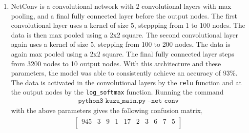 \documentclass[a4paper,11pt]{article}
\newcommand{\code}{\texttt}
\begin{document}
{{\begin{enumerate}[leftmargin=*]
			\begin{align*}
				\code{python3 kuzu\_main.py --net full} 
			\end{align*}
			with 170 hidden nodes gives the following confusion matrix,
			\begin{align*}
				\begin{bmatrix}
					856 & 5 & 8 & 3 & 44 & 8 & 3 & 16 & 11 & 4 \\
					3 & 820 & 10 & 12 & 27 & 11 & 11 & 11 & 27 & 17 \\
					2 & 30 & 826 & 33 & 20 & 69 & 40 & 17 & 24 & 46 \\
					6 & 2 & 46 & 913 & 5 & 11 & 9 & 5 & 39 & 5 \\
					29 & 18 & 13 & 3 & 814 & 15 & 16 & 22 & 6 & 29 \\
					30 & 10 & 22 & 14 & 9 & 834 & 7 & 10 & 10 & 7 \\
					4 & 53 & 24 & 4 & 29 & 26 & 897 & 38 & 28 & 23 \\
					35 & 7 & 12 & 2 & 18 & 3 & 7 & 834 & 3 & 19 \\
					30 & 24 & 22 & 7 & 20 & 17 & 2 & 25 & 844 & 9 \\
					5 & 31 & 17 & 9 & 14 & 6 & 8 & 22 & 8 & 841 \\
				\end{bmatrix}
			\end{align*}
			with an accuracy of 8479/10000 or 85\%.
		\item NetConv is a convolutional network with 2 convolutional layers with max pooling, and a final fully connected layer before the output nodes. The first convolutional layer uses a kernel of size 5, steppping from 1 to 100 nodes. The data is then max pooled using a 2x2 square. The second convolutional layer again uses a kernel of size 5, stepping from 100 to 200 nodes. The data is again max pooled using a 2x2 square. The final fully connected layer steps from 3200 nodes to 10 output nodes. With this architecture and these parameters, the model was able to consistently achieve an accuracy of 93\%. The data is activated in the convolutional layers by the \code{relu} function and at the output nodes by the \code{log\_softmax} function. Running the command 
			\begin{align*}
				\code{python3 kuzu\_main.py --net conv} 
			\end{align*}
			with the above parameters gives the following confusion matrix,
			\begin{align*}
				\begin{bmatrix}
					945 & 3 & 9 & 1 & 17 & 2 & 3 & 6 & 7 & 5 \\

\end{bmatrix}
\end{align*}
\end{enumerate}}}
\end{document}
